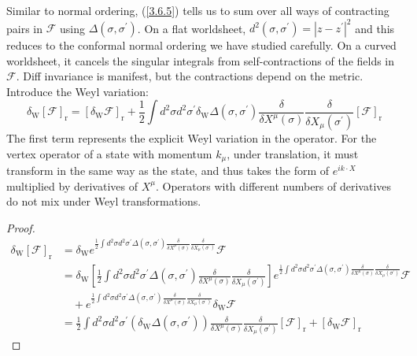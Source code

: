 Similar to normal ordering, (\ref{3.6.5}) tells us to sum over all ways of contracting pairs in $\mathscr{F}$ using $\Delta\left(\sigma, \sigma^{\prime}\right)$. On a flat worldsheet, $d^{2}\left(\sigma, \sigma^{\prime}\right)=\left|z-z^{\prime}\right|^{2}$ and this reduces to the conformal normal ordering we have studied carefully. On a curved worldsheet, it cancels the singular integrals from self-contractions of the fields in $\mathscr{F}$. Diff invariance is manifest, but the contractions depend on the metric. Introduce the Weyl variation:
\begin{equation}\label{3.6.7}
	\delta_{\mathrm{W}}[\mathscr{F}]_{\mathrm{r}}=\left[\delta_{\mathrm{W}} \mathscr{F}\right]_{\mathrm{r}}+\frac{1}{2} \int d^{2} \sigma d^{2} \sigma^{\prime} \delta_{\mathrm{W}} \Delta\left(\sigma, \sigma^{\prime}\right) \frac{\delta}{\delta X^{\mu}(\sigma)} \frac{\delta}{\delta X_{\mu}\left(\sigma^{\prime}\right)}[\mathscr{F}]_{\mathrm{r}}
\end{equation}
The first term represents the explicit Weyl variation in the operator. For the vertex operator of a state with momentum $k_\mu$, under translation, it must transform in the same way as the state, and thus takes the form of $e^{ik\cdot X}$ multiplied by derivatives of $X^\mu$. Operators with different numbers of derivatives do not mix under Weyl transformations.
\begin{tcolorbox}[breakable]
	\begin{proof}
		\begin{align}
			\delta_{\mathrm{W}}[\mathcal{F}]_{\mathrm{r}} & =\delta_{\mathrm{W}} e^{\frac{1}{2} \int d^2 \sigma d^2 \sigma^{\prime} \Delta\left(\sigma, \sigma^{\prime}\right) \frac{\delta}{\delta X^\mu(\sigma)} \frac{\delta}{\delta X_\mu\left(\sigma^{\prime}\right)}} \mathcal{F} \nonumber\\
			& =\delta_{\mathrm{W}}\left[\frac{1}{2} \int d^2 \sigma d^2 \sigma^{\prime} \Delta\left(\sigma, \sigma^{\prime}\right) \frac{\delta}{\delta X^\mu(\sigma)} \frac{\delta}{\delta X_\mu\left(\sigma^{\prime}\right)}\right] e^{\frac{1}{2} \int d^2 \sigma d^2 \sigma^{\prime} \Delta\left(\sigma, \sigma^{\prime}\right) \frac{\delta}{\delta X^\mu(\sigma)} \frac{\delta}{\delta X_\mu\left(\sigma^{\prime}\right)}} \mathcal{F} \nonumber\\
			& \quad + e^{\frac{1}{2} \int d^2 \sigma d^2 \sigma^{\prime} \Delta\left(\sigma, \sigma^{\prime}\right) \frac{\delta}{\delta X^\mu(\sigma)} \frac{\delta}{\delta X_\mu\left(\sigma^{\prime}\right)}} \delta_{\mathrm{W}} \mathcal{F} \nonumber\\
			& =\frac{1}{2} \int d^2 \sigma d^2 \sigma^{\prime}\left(\delta_{\mathrm{W}} \Delta\left(\sigma, \sigma^{\prime}\right)\right) \frac{\delta}{\delta X^\mu(\sigma)} \frac{\delta}{\delta X_\mu\left(\sigma^{\prime}\right)}[\mathcal{F}]_{\mathrm{r}}+\left[\delta_{\mathrm{W}} \mathcal{F}\right]_{\mathrm{r}}
		\end{align}
	\end{proof}
\end{tcolorbox}
